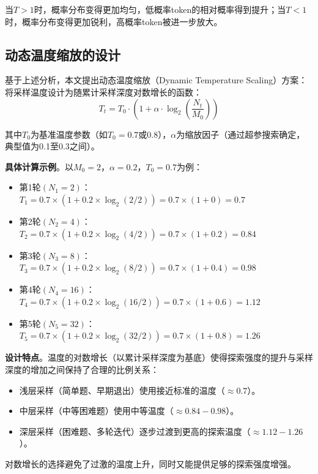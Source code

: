 当$T > 1$时，概率分布变得更加均匀，低概率token的相对概率得到提升；当$T < 1$时，概率分布变得更加锐利，高概率token被进一步放大。

\subsection{动态温度缩放的设计}
\label{subsec:dynamic_temperature}

基于上述分析，本文提出动态温度缩放（Dynamic Temperature Scaling）方案：将采样温度设计为随累计采样深度对数增长的函数：
\begin{equation}
T_t = T_0 \cdot \left(1 + \alpha \cdot \log_2\left(\frac{N_t}{M_0}\right)\right)
\label{eq:dynamic_temperature}
\end{equation}

其中$T_0$为基准温度参数（如$T_0 = 0.7$或$0.8$），$\alpha$为缩放因子（通过超参搜索确定，典型值为0.1至0.3之间）。

\textbf{具体计算示例}。以$M_0 = 2$，$\alpha = 0.2$，$T_0 = 0.7$为例：

\begin{itemize}
    \item 第1轮$(N_1 = 2)$：$T_1 = 0.7 \times (1 + 0.2 \times \log_2(2/2)) = 0.7 \times (1 + 0) = 0.7$
    \item 第2轮$(N_2 = 4)$：$T_2 = 0.7 \times (1 + 0.2 \times \log_2(4/2)) = 0.7 \times (1 + 0.2) = 0.84$
    \item 第3轮$(N_3 = 8)$：$T_3 = 0.7 \times (1 + 0.2 \times \log_2(8/2)) = 0.7 \times (1 + 0.4) = 0.98$
    \item 第4轮$(N_4 = 16)$：$T_4 = 0.7 \times (1 + 0.2 \times \log_2(16/2)) = 0.7 \times (1 + 0.6) = 1.12$
    \item 第5轮$(N_5 = 32)$：$T_5 = 0.7 \times (1 + 0.2 \times \log_2(32/2)) = 0.7 \times (1 + 0.8) = 1.26$
\end{itemize}

\textbf{设计特点}。温度的对数增长（以累计采样深度为基底）使得探索强度的提升与采样深度的增加之间保持了合理的比例关系：
\begin{itemize}
    \item 浅层采样（简单题、早期退出）使用接近标准的温度（$\approx 0.7$）。
    \item 中层采样（中等困难题）使用中等温度（$\approx 0.84 - 0.98$）。
    \item 深层采样（困难题、多轮迭代）逐步过渡到更高的探索温度（$\approx 1.12 - 1.26$）。
\end{itemize}

对数增长的选择避免了过激的温度上升，同时又能提供足够的探索强度增强。

